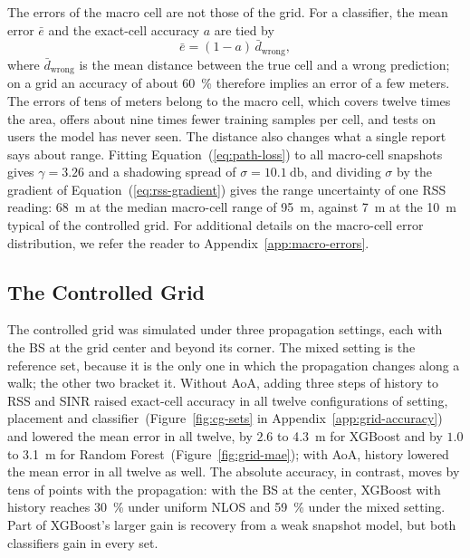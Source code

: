 The errors of the macro cell are not those of the grid. For a classifier, the mean error $\bar{e}$ and the exact-cell accuracy $a$ are tied by
\begin{equation}
  \bar{e} = (1-a)\,\bar{d}_{\text{wrong}},
  \label{eq:mae-accuracy}
\end{equation}
where $\bar{d}_{\text{wrong}}$ is the mean distance between the true cell and a wrong prediction; on a  grid an accuracy of about \SI{60}{\percent} therefore implies an error of a few meters. The errors of tens of meters belong to the macro cell, which covers twelve times the area, offers about nine times fewer training samples per cell, and tests on users the model has never seen. The distance also changes what a single report says about range. Fitting Equation~(\ref{eq:path-loss}) to all macro-cell snapshots gives $\gamma = 3.26$ and a shadowing spread of $\sigma = \SI{10.1}{\decibel}$, and dividing $\sigma$ by the gradient of Equation~(\ref{eq:rss-gradient}) gives the range uncertainty of one RSS reading: \SI{68}{\meter} at the median macro-cell range of \SI{95}{\meter}, against \SI{7}{\meter} at the \SI{10}{\meter} typical of the controlled grid. For additional details on the macro-cell error distribution, we refer the reader to Appendix~\ref{app:macro-errors}.

\subsection{The Controlled Grid}
\label{subsec:gain-grid}

The controlled grid was simulated under three propagation settings, each with the BS at the grid center and beyond its corner. The mixed setting is the reference set, because it is the only one in which the propagation changes along a walk; the other two bracket it. Without AoA, adding three steps of history to RSS and SINR raised exact-cell accuracy in all twelve configurations of setting, placement and classifier~(Figure~\ref{fig:cg-sets} in Appendix~\ref{app:grid-accuracy}) and lowered the mean error in all twelve, by $2.6$ to \SI{4.3}{\meter} for XGBoost and by $1.0$ to \SI{3.1}{\meter} for Random Forest~(Figure~\ref{fig:grid-mae}); with AoA, history lowered the mean error in all twelve as well. The absolute accuracy, in contrast, moves by tens of points with the propagation: with the BS at the center, XGBoost with history reaches \SI{30}{\percent} under uniform NLOS and \SI{59}{\percent} under the mixed setting. Part of XGBoost's larger gain is recovery from a weak snapshot model, but both classifiers gain in every set.


